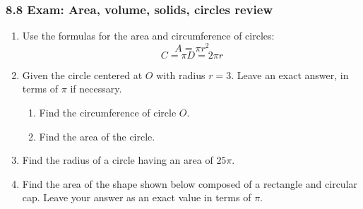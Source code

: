 \documentclass[12pt, twoside]{article}
\begin{document}
\subsubsection*{8.8 Exam: Area, volume, solids, circles review}
 \begin{enumerate}

  \item Use the formulas for the area and circumference of circles:
  \[A=\pi r^2\]
  \[C=\pi D = 2\pi r\]
  
  \item Given the circle centered at $O$ with radius $r=3$. Leave an exact answer, in terms of $\pi$ if necessary.
  \begin{multicols}{2}
    \begin{enumerate}
      \item Find the circumference of circle $O$. %
      \item Find the area of the circle.\vspace{2cm}
    \end{enumerate}
  \end{multicols}

  \item Find the radius of a circle having an area of $25 \pi$. \vspace{2cm}
  
  \item Find the area of the shape shown below composed of a rectangle and circular cap. Leave your answer as an exact value in terms of $\pi$.
    \begin{flushright}
  \end{flushright}\vspace{1cm}


\end{enumerate}
\end{document}
